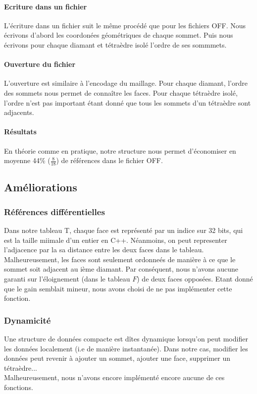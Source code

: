 \documentclass[a4paper,11pt,openany]{article}
\begin{document}
\paragraph{Ecriture dans un fichier}
L'écriture dans un fichier suit le même procédé que pour les fichiers OFF. Nous écrivons d'abord les coordonées géométriques de chaque sommet. Puis nous écrivons pour chaque diamant et tétraèdre isolé l'ordre de ses sommmets.

\paragraph{Ouverture du fichier}
L'ouverture est similaire à l'encodage du maillage. Pour chaque diamant, l'ordre des sommets nous permet de connaître les faces. Pour chaque tétraèdre isolé, l'ordre n'est pas important étant donné que tous les sommets d'un tétraèdre sont adjacents.

\paragraph{Résultats}
En théorie comme en pratique, notre structure nous permet d'économiser en moyenne 44\% ($\frac{8}{18}$) de références dans le fichier OFF.

\subsection{Améliorations}
\subsubsection{Références différentielles}
\noindent
Dans notre tableau T, chaque face est représenté par un indice sur 32 bits, qui est la taille miimale d'un entier en C++. Néanmoins, on peut representer l'adjacence par la sa distance entre les deux faces dans le tableau.\\
Malheureusement, les faces sont seulement ordonneés de manière à ce que le sommet soit adjacent au ième diamant. Par conséquent, nous n'avons aucune garanti sur l'éloignement (dans le tableau $F$) de deux faces opposées. Etant donné que le gain semblait mineur, nous avons choisi de ne pas implémenter cette fonction.

\subsubsection{Dynamicité}
\noindent
Une structure de données compacte est dîtes dynamique lorsqu'on peut modifier les données localement (i.e de manière instantanée). Dans notre cas, modifier les données peut revenir à ajouter un sommet, ajouter une face, supprimer un tétraèdre...\\
Malheureusement, nous n'avons encore implémenté encore aucune de ces fonctions.
\end{document}
